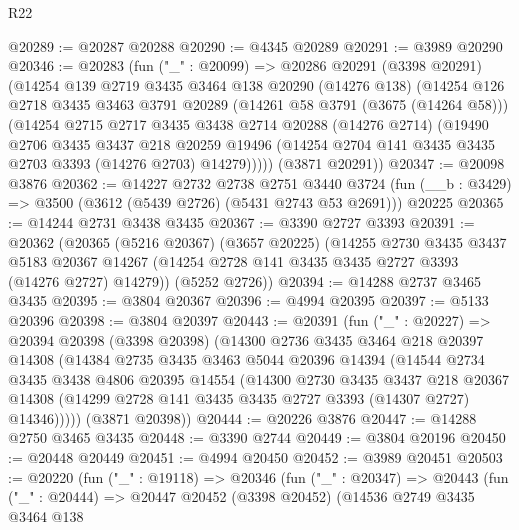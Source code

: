 \begin{lexlean}{R22}
\begin{coremodule}
@20289 := @20287 @20288
@20290 := @4345 @20289
@20291 := @3989 @20290
@20346 := @20283
    (fun ("_" : @20099) =>
    @20286
      @20291
      (@3398 @20291)
      (@14254
        @139
        @2719
        @3435
        @3464
        @138
        @20290
        (@14276 @138)
        (@14254
          @126
          @2718
          @3435
          @3463
          @3791
          @20289
          (@14261 @58 @3791 (@3675 (@14264 @58)))
          (@14254
            @2715
            @2717
            @3435
            @3438
            @2714
            @20288
            (@14276 @2714)
            (@19490
              @2706
              @3435
              @3437
              @218
              @20259
              @19496
              (@14254 @2704 @141 @3435 @3435 @2703 @3393 (@14276 @2703) @14279)))))
      (@3871 @20291))
@20347 := @20098 @3876
@20362 := @14227
    @2732
    @2738
    @2751
    @3440
    @3724
    (fun (__b : @3429) => @3500 (@3612 (@5439 @2726) (@5431 @2743 @53 @2691)))
    @20225
@20365 := @14244 @2731 @3438 @3435
@20367 := @3390 @2727 @3393
@20391 := @20362
    (@20365
      (@5216 @20367)
      (@3657 @20225)
      (@14255
        @2730
        @3435
        @3437
        @5183
        @20367
        @14267
        (@14254 @2728 @141 @3435 @3435 @2727 @3393 (@14276 @2727) @14279))
      (@5252 @2726))
@20394 := @14288 @2737 @3465 @3435
@20395 := @3804 @20367
@20396 := @4994 @20395
@20397 := @5133 @20396
@20398 := @3804 @20397
@20443 := @20391
    (fun ("_" : @20227) =>
    @20394
      @20398
      (@3398 @20398)
      (@14300
        @2736
        @3435
        @3464
        @218
        @20397
        @14308
        (@14384
          @2735
          @3435
          @3463
          @5044
          @20396
          @14394
          (@14544
            @2734
            @3435
            @3438
            @4806
            @20395
            @14554
            (@14300
              @2730
              @3435
              @3437
              @218
              @20367
              @14308
              (@14299 @2728 @141 @3435 @3435 @2727 @3393 (@14307 @2727) @14346)))))
      (@3871 @20398))
@20444 := @20226 @3876
@20447 := @14288 @2750 @3465 @3435
@20448 := @3390 @2744
@20449 := @3804 @20196
@20450 := @20448 @20449
@20451 := @4994 @20450
@20452 := @3989 @20451
@20503 := @20220
    (fun ("_" : @19118) =>
    @20346
      (fun ("_" : @20347) =>
      @20443
        (fun ("_" : @20444) =>
        @20447
          @20452
          (@3398 @20452)
          (@14536
            @2749
            @3435
            @3464
            @138

\end{coremodule}
\end{lexlean}
